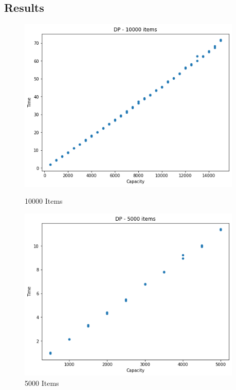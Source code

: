 \documentclass[a4]{article}
\begin{document}
\subsection{Results}
\begin{figure}[H]
    \begin{minipage}{0.48\textwidth}
    \includegraphics[width=0.95\textwidth]{dp-10000.png}
    \caption{10000 Items}
    \end{minipage}
    \begin{minipage}{0.48\textwidth}
        \includegraphics[width=0.95\textwidth]{dp-5000.png}
        \caption{5000 Items}
        \end{minipage}
\end{figure}
\end{document}
